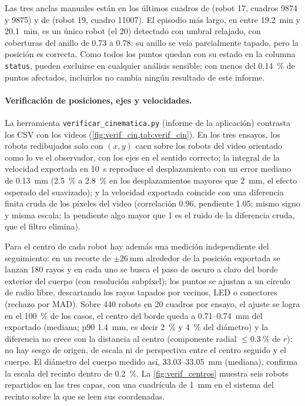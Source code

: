 Las tres anclas manuales están en los últimos cuadros de  (robot 17, cuadros 9874 y
9875) y de  (robot 19, cuadro 11007). El episodio más largo, en  entre
\SI{19.2}{\minute} y \SI{20.1}{\minute}, es un único robot (el 20) detectado con umbral relajado,
con coberturas del anillo de \num{0.73} a \num{0.78}: su anillo se veía parcialmente tapado, pero la
posición es correcta. Como todos los puntos quedan con su estado en la columna \texttt{status},
pueden excluirse en cualquier análisis sensible; con menos del \SI{0.14}{\percent} de puntos
afectados, incluirlos no cambia ningún resultado de este informe.

\paragraph{Verificación de posiciones, ejes y velocidades.} La herramienta
\texttt{verificar\_cinematica.py} (informe de la aplicación) contrasta los CSV con los videos
(\cref{fig:verif_cin,tab:verif_cin}). En los tres ensayos, los robots redibujados solo con
$(x, y)$ caen sobre los robots del video orientado como lo ve el observador, con los ejes en el sentido
correcto; la integral de
la velocidad exportada en \SI{10}{\second} reproduce el desplazamiento con un error mediano de
\SI{0.13}{\milli\metre} (\SI{2.5}{\percent} a \SI{2.8}{\percent} en los desplazamientos mayores que
\SI{2}{\milli\metre}, el efecto esperado del suavizado); y la velocidad exportada coincide con una
diferencia finita cruda de los píxeles del video (correlación \num{0.96}, pendiente \num{1.05}: mismo
signo y misma escala; la pendiente algo mayor que 1 es el ruido de la diferencia cruda, que el filtro
elimina).

Para el centro de cada robot hay además una medición independiente del seguimiento: en un recorte de
$\pm\SI{26}{\milli\metre}$ alrededor de la posición exportada se lanzan 180 rayos y en cada uno se busca el
paso de oscuro a claro del borde exterior del cuerpo (con resolución subpíxel); los puntos se ajustan a un
círculo de radio libre, descartando los rayos tapados por vecinos, LED o conectores (rechazo por MAD). Sobre
440 robots en 20 cuadros por ensayo, el ajuste se logra en el \SI{100}{\percent} de los casos, el centro
del borde queda a \num{0.71}--\SI{0.74}{\milli\metre} del exportado (mediana; p90
\SI{1.4}{\milli\metre}, es decir \SI{2}{\percent} y \SI{4}{\percent} del diámetro) y la diferencia no
crece con la distancia al centro (componente radial $\leq \SI{0.3}{\percent}$ de $r$): no hay sesgo de
origen, de escala ni de perspectiva entre el centro seguido y el cuerpo. El diámetro del cuerpo medido así,
\num{33.03}--\SI{33.05}{\milli\metre} (mediana), confirma la escala del recinto dentro de
\SI{0.2}{\percent}. La \cref{fig:verif_centros} muestra seis robots repartidos en las tres capas, con una
cuadrícula de \SI{1}{\milli\metre} en el sistema del recinto sobre la que se leen sus coordenadas.

